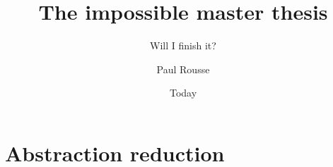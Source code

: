 \documentclass{kthesis}
\theoremstyle{named}
\newcommand{\vect}[1]{\ensuremath{ \mathbf{#1}}}
\begin{document}
\title{The impossible master thesis}
\subtitle{Will I finish it?}
\author{Paul Rousse}
\date{Today}
\imprint{}
\disputationsdatum{}
\disputationslokal{}
\publisher{}
\examen{}

\frontmatter

\maketitle

\mainmatter 

\chapter{Abstraction reduction}
\newcommand{\Ninputs}{\Delta n_u}%
\newcommand{\x}{\vect{x}}%
\newcommand{\xa}{\vect{x}^a}%
\newcommand{\xobs}{\vect{x}^o}%
\newcommand{\Xobs}{X^o}%
\newcommand{\Xobsinit}{X^o_0}%
\newcommand{\xunobs}{\vect{x}^i}%
\newcommand{\Xunobs}{X^i}%
\newcommand{\Xuinv}{{\mathcal{X}^i}}%
\newcommand{\pastuseq}{\vect{u}_{n-\Ninputs},\dots,\vect{u}_{n-1}}%
\newcommand{\Pastuseq}{U_n}%
\newcommand{\sys}{\mathcal{S}}%
\newcommand{\sysa}{\mathcal{S}_a}%
\newcommand{\sysaU}{\mathcal{U}}%
\newcommand{\sysA}{\mathcal{S}_A}%
\newcommand{\sysB}{\mathcal{S}_B}%

%
%
\end{document}
